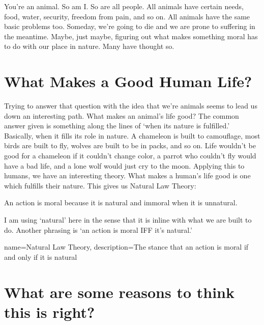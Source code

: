 You’re an animal. So am I. So are all people. All animals have certain needs, food, water, security, freedom from pain, and so on. All animals have the same basic problems too. Someday, we’re going to die and we are prone to suffering in the meantime. Maybe, just maybe, figuring out what makes something moral has to do with our place in nature. Many have thought so.

\section{What Makes a Good Human Life?}

Trying to answer that question with the idea that we’re animals seems to lead us down an interesting path. What makes an animal’s life good? The common answer given is something along the lines of ‘when its nature is fulfilled.’ Basically, when it fills its role in nature. A chameleon is built to camouflage, most birds are built to fly, wolves are built to be in packs, and so on. Life wouldn’t be good for a chameleon if it couldn’t change color, a parrot who couldn’t fly would have a bad life, and a lone wolf would just cry to the moon. Applying this to humans, we have an interesting theory. What makes a human’s life good is one which fulfills their nature. This gives us \gls{Natural Law Theory}:
\begin{center}
An action is moral because it is natural and immoral when it is unnatural.
\end{center}
I am using ‘natural’ here in the sense that it is inline with what we are built to do. Another phrasing is ‘an action is moral IFF it’s natural.’

{
  name=Natural Law Theory,
  description={The stance that an action is moral if and only if it is natural}
}

\section{What are some reasons to think this is right?}

